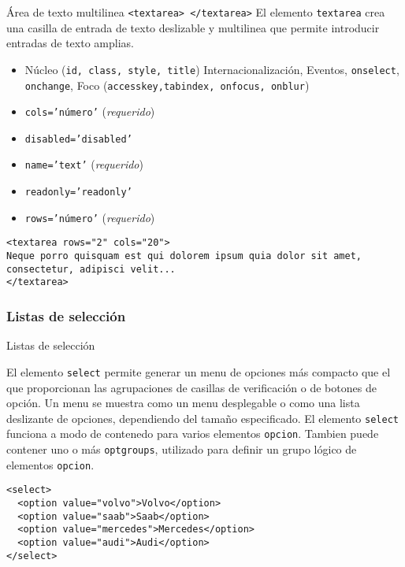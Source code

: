 \documentclass{beamer}
\begin{document}
\begin{frame}[fragile]{Área de texto multilinea \texttt{<textarea> </textarea>}} %
El elemento \texttt{textarea} crea una casilla de entrada de texto deslizable y
multilinea que permite introducir entradas de texto amplias. \\

\footnotesize{
    \begin{itemize}
        \item Núcleo (\texttt{id, class, style, title}) Internacionalización,
        Eventos, \texttt{onselect}, \texttt{onchange},  Foco (\texttt{accesskey,tabindex, onfocus, onblur})
        \item \texttt{cols='número'} (\textit{requerido})
        \item \texttt{disabled='disabled'}
        \item \texttt{name='text'} (\textit{requerido})
        \item \texttt{readonly='readonly'}
        \item \texttt{rows='número'} (\textit{requerido})
    \end{itemize}
    \begin{lstlisting}
<textarea rows="2" cols="20">
Neque porro quisquam est qui dolorem ipsum quia dolor sit amet, consectetur, adipisci velit...
</textarea>

    \end{lstlisting}
}
\end{frame}

\subsubsection{Listas de selección} 

\begin{frame}[fragile]{Listas de selección} %
    \footnotesize{
    El elemento \texttt{select} permite generar un menu de opciones más
    compacto que el que proporcionan las agrupaciones de casillas de
    verificación o de botones de opción. Un menu se muestra como un menu
    desplegable o como una lista deslizante de opciones, dependiendo del tamaño
    especificado. El elemento \texttt{select} funciona a modo de contenedo para
    varios elementos \texttt{opcion}. Tambien puede contener uno o más
    \texttt{optgroups}, utilizado para definir un grupo lógico de elementos
    \texttt{opcion}. 

\begin{lstlisting}
<select>
  <option value="volvo">Volvo</option>
  <option value="saab">Saab</option>
  <option value="mercedes">Mercedes</option>
  <option value="audi">Audi</option>
</select>    
\end{lstlisting}

    }
\end{frame}
\end{document}
